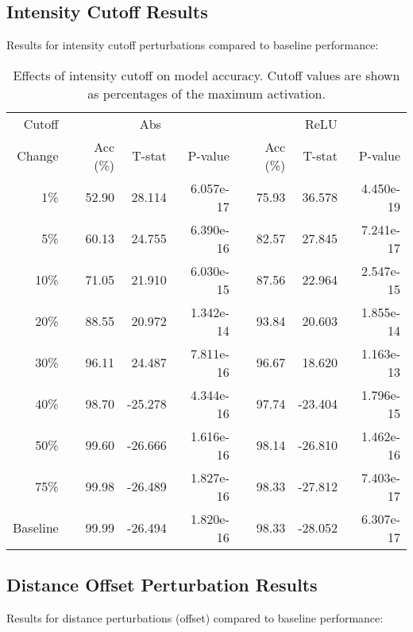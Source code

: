 \subsection{Intensity Cutoff Results}

Results for intensity cutoff perturbations compared to baseline performance:

\begin{table}[h]
\centering
\begin{tabular}{r|rrr|rrr}
Cutoff & \multicolumn{3}{|c|}{Abs} & \multicolumn{3}{|c}{ReLU} \\
Change & Acc (\%) & T-stat & P-value & Acc (\%) & T-stat & P-value \\
\hline
1\% & 52.90 & 28.114 & 6.057e-17 & 75.93 & 36.578 & 4.450e-19 \\
5\% & 60.13 & 24.755 & 6.390e-16 & 82.57 & 27.845 & 7.241e-17 \\
10\% & 71.05 & 21.910 & 6.030e-15 & 87.56 & 22.964 & 2.547e-15 \\
20\% & 88.55 & 20.972 & 1.342e-14 & 93.84 & 20.603 & 1.855e-14 \\
30\% & 96.11 & 24.487 & 7.811e-16 & 96.67 & 18.620 & 1.163e-13 \\
40\% & 98.70 & -25.278 & 4.344e-16 & 97.74 & -23.404 & 1.796e-15 \\
50\% & 99.60 & -26.666 & 1.616e-16 & 98.14 & -26.810 & 1.462e-16 \\
75\% & 99.98 & -26.489 & 1.827e-16 & 98.33 & -27.812 & 7.403e-17 \\
Baseline & 99.99 & -26.494 & 1.820e-16 & 98.33 & -28.052 & 6.307e-17 \\
\end{tabular}
\caption{Effects of intensity cutoff on model accuracy. Cutoff values are shown as percentages of the maximum activation.}
\label{tab:app_b_cutoff}
\end{table}

\subsection{Distance Offset Perturbation Results}

Results for distance perturbations (offset) compared to baseline performance:

